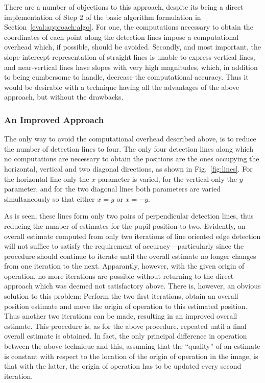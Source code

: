There are a number of objections to this approach, despite its being a
direct implementation of Step 2 of the basic algorithm formulation in
Section~\ref{eval:approach:algo}.  For one, the computations necessary
to obtain the coordinates of each point along the detection lines
impose a computational overhead which, if possible, should be avoided.
Secondly, and most important, the slope-intercept representation of
straight lines is unable to express vertical lines, and near-vertical
lines have slopes with very high magnitudes, which, in addition to
being cumbersome to handle, decrease the computational accuracy.  Thus
it would be desirable with a technique having all the advantages of
the above approach, but without the drawbacks.

\subsubsection{An Improved Approach}


The only way to avoid the computational overhead described above, is
to reduce the number of detection lines to four.  The only four
detection lines along which no computations are necessary to obtain
the positions are the ones occupying the horizontal, vertical and two
diagonal directions, as shown in Fig.~\ref{fig:lines}.  For the
horizontal line only the $x$ parameter is varied, for the vertical
only the $y$ parameter, and for the two diagonal lines both parameters
are varied simultaneously so that either $x=y$ or $x=-y$.  

As is seen, these lines form only two pairs of perpendicular detection
lines, thus reducing the number of estimates for the pupil position to
two.  Evidently, an overall estimate computed from only two iterations
of line oriented edge detection will not suffice to satisfy the
requirement of accuracy---particularly since the procedure should
continue to iterate until the overall estimate no longer changes from
one iteration to the next.  Apparantly, however, with the given origin
of operation, no more iterations are possible without returning to the
direct approach which was deemed not satisfactory above.  There is,
however, an obvious solution to this problem: Perform the two first
iterations, obtain an overall position estimate and move the origin of
operation to this estimated position.  Thus another two iterations can
be made, resulting in an improved overall estimate.  This procedure
is, as for the above procedure, repeated until a final overall
estimate is obtained.  In fact, the only principal difference in
operation between the above technique and this, assuming that the
``quality'' of an estimate is constant with respect to the location of
the origin of operation in the image, is that with the latter, the
origin of operation has to be updated every second iteration.

